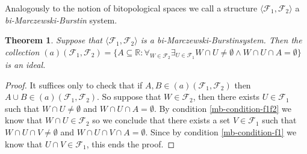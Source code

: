 \documentclass[12pt]{amsart}
\theoremstyle{plain}
\newtheorem{theorem}{Theorem}[section]
\theoremstyle{definition}
\theoremstyle{remark}
\newcommand{\real}{\mathbb{R}}
\newcommand{\cF}{{\mathcal F}}
\newcommand{\aideal}{\mathit{(a)}}
\newcommand{\biMB}{bi-Marczewski-Burstin}
\begin{document}
Analogously to the notion of bitopological spaces we call a structure
$\langle \cF_1, \cF_2 \rangle$ a {\it\biMB} system.

\begin{theorem}
Suppose that $\langle \cF_1, \cF_2 \rangle$ is a \biMB system.
Then the collection
$\aideal(\cF_1, \cF_2) = \lbrace A \subseteq \real\colon 
\forall_{W\in \cF_2} \exists_{U \in \cF_1}
W \cap U \not= \emptyset \wedge W \cap U \cap A = \emptyset
\rbrace$ 
is an ideal. 
\end{theorem}
\begin{proof}
It suffices only to check that if $A, B \in \aideal(\cF_1, \cF_2)$ then
$A\cup B \in \aideal(\cF_1, \cF_2)$.
So suppose that $W \in \cF_2$, then there exists $U\in\cF_1$
such that 
$W \cap U \not= \emptyset$ and $W \cap U \cap A = \emptyset$.
By condition \ref{mb-condition-f1f2} 
we know that $W \cap U \in \cF_2$ so
we conclude that
there exists a set $V \in \cF_1$ such that
$W \cap U \cap V \not= \emptyset$ and $W \cap U \cap V \cap A = \emptyset$.
Since by condition \ref{mb-condition-f1} we know that 
$U \cap V \in \cF_1$, this ends the proof.
\end{proof}
\end{document}
